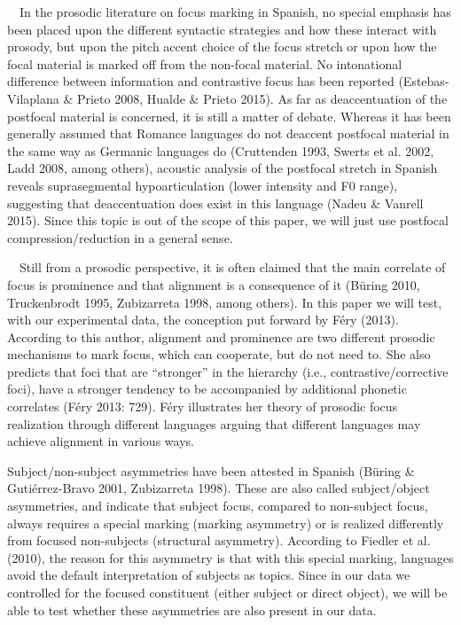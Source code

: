 \documentclass[11pt]{article}
\newenvironment{styleStandard}{\setlength\leftskip{0cm}\setlength\rightskip{0cm plus 1fil}\setlength\parindent{0cm}\setlength\parfillskip{0pt plus 1fil}\setlength\parskip{0in plus 1pt}\writerlistparindent\writerlistleftskip\leavevmode\normalfont\normalsize\writerlistlabel\ignorespaces}{\unskip\vspace{0.139in plus 0.0139in}\par}
\newenvironment{styleListParagraph}{\setlength\leftskip{0.5in}\setlength\rightskip{0in plus 1fil}\setlength\parindent{0in}\setlength\parfillskip{0pt plus 1fil}\setlength\parskip{0in plus 1pt}\writerlistparindent\writerlistleftskip\leavevmode\normalfont\normalsize\writerlistlabel\ignorespaces}{\unskip\vspace{0.139in plus 0.0139in}\par}
\newcommand\writerlistleftskip{}
\newcommand\writerlistparindent{}
\newcommand\writerlistlabel{}
\begin{document}
\begin{styleListParagraph}
\ \ In the prosodic literature on focus marking in Spanish, no special emphasis has been placed upon the different syntactic strategies and how these interact with prosody, but upon the pitch accent choice of the focus stretch or upon how the focal material is marked off from the non-focal material. No intonational difference between information and contrastive focus has been reported (Estebas-Vilaplana \& Prieto 2008, Hualde \& Prieto 2015). As far as deaccentuation of the postfocal material is concerned, it is still a matter of debate. Whereas it has been generally assumed that Romance languages do not deaccent postfocal material in the same way as Germanic languages do (Cruttenden 1993, Swerts et al. 2002, Ladd 2008, among others), acoustic analysis of the postfocal stretch in Spanish reveals suprasegmental hypoarticulation (lower intensity and F0 range), suggesting that deaccentuation does exist in this language (Nadeu \& Vanrell 2015). Since this topic is out of the scope of this paper, we will just use postfocal compression/reduction in a general sense.
\end{styleListParagraph}


\begin{styleStandard}
\ \ Still from a prosodic perspective, it is often claimed that the main correlate of focus is prominence and that alignment is a consequence of it (Büring 2010, Truckenbrodt 1995, Zubizarreta 1998, among others). In this paper we will test, with our experimental data, the conception put forward by Féry (2013). According to this author, alignment and prominence are two different prosodic mechanisms to mark focus, which can cooperate, but do not need to. She also predicts that foci that are “stronger” in the hierarchy (i.e., contrastive/corrective foci), have a stronger tendency to be accompanied by additional phonetic correlates (Féry 2013: 729). Féry illustrates her theory of prosodic focus realization through different languages arguing that different languages may achieve alignment in various ways.
\end{styleStandard}


\begin{styleStandard}
Subject/non-subject asymmetries have been attested in Spanish (Büring \& Gutiérrez-Bravo 2001, Zubizarreta 1998). These are also called subject/object asymmetries, and indicate that subject focus, compared to non-subject focus, always requires a special marking (marking asymmetry) or is realized differently from focused non-subjects (structural asymmetry). According to Fiedler et al. (2010), the reason for this asymmetry is that with this special marking, languages avoid the default interpretation of subjects as topics. Since in our data we controlled for the focused constituent (either subject or direct object), we will be able to test whether these asymmetries are also present in our data.
\end{styleStandard}
\end{document}
